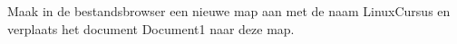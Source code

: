 Maak in de bestandsbrowser een nieuwe map aan met de naam LinuxCursus en verplaats het document Document1 naar deze map.

